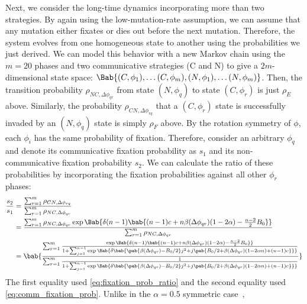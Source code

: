 Next, we consider the long-time dynamics incorporating more than two strategies.
By again using the low-mutation-rate assumption,
we can assume that any mutation either fixates
or dies out before the next mutation.
Therefore, the system evolves from one homogeneous state to another
using the probabilities we just derived.
We can model this behavior with a new Markov chain
using the $m=20$ phases and two communicative strategies (C and N)
to give a $2m$-dimensional state space:
$\Bab{(C,\phi_1), \ldots (C,\phi_m), (N,\phi_1), \ldots (N,\phi_m)}$.
Then, the transition probability $\rho_{NC,\Delta \phi_{qr}}$
from state $(N,\phi_q)$ to state $(C,\phi_r)$ is just $\rho_E$ above.
Similarly, the probability $\rho_{CN,\Delta \phi_{rq}}$
that a $(C,\phi_r)$ state is successfully invaded by
an $(N,\phi_q)$ state is simply $\rho_F$ above.
By the rotation symmetry of $\phi$, each $\phi_i$ has the same probability of fixation.
Therefore, consider an arbitrary $\phi_q$ and denote its communicative fixation probability as
$s_1$ and its non-communicative fixation probability $s_2$.
We can calculate the ratio of these probabilities
by incorporating the fixation probabilities against all other $\phi_r$ phases:
\begin{align}
  \frac{s_2}{s_1} &= \frac
    {\sum_{r=1}^{m} \rho_{CN,\Delta \phi_{rq}}}
    {\sum_{r=1}^{m} \rho_{NC,\Delta \phi_{qr}} }
  \\
  &=
  \frac
  {\sum_{r=1}^{m} \rho_{NC,\Delta \phi_{qr}}
    \exp \Bab{
      \delta (n-1)
      \bab{
        (n-1) c + n \beta(\Delta \phi_{qr}) (1 - 2 \alpha)
        - \frac{n-2}{2} B_0
      }
    }
  }
  {\sum_{r=1}^{m} \rho_{NC,\Delta \phi_{qr}}}
  \\
  &=
  \bab{
    \frac
    {\sum_{r=1}^{m} \frac
      {\exp \Bab{ \delta (n-1)
        \bab{
          (n-1) c + n \beta(\Delta \phi_{qr}) (1 - 2 \alpha) - \frac{n-2}{2} B_0
        }}
      }
      {1 + \sum_{j=1}^{n-1} \exp\Bab{
        \delta \bab{
         \pab{\beta(\Delta \phi_{qr}) - B_0/2} j^2
         + j \pab{B_0/2 + \beta(\Delta \phi_{qr}) (1 - 2 \alpha n) + (n-1) c}
        }}
      }
    }
    {\sum_{r=1}^{m} \frac{1}
      {1 + \sum_{j=1}^{n-1} \exp\Bab{
        \delta \bab{
         \pab{\beta(\Delta \phi_{qr}) - B_0/2} j^2
         + j \pab{B_0/2 + \beta(\Delta \phi_{qr}) (1 - 2 \alpha n) + (n-1) c}
        }}
      }
    }
  }
  \label{eq:full_analytic_frac}
\end{align}
The first equality used \cref{eq:fixation_prob_ratio}
and the second equality used \cref{eq:comm_fixation_prob}.
Unlike in the $\alpha = 0.5$ symmetric case~\citep{tripp2022evolutionary},
